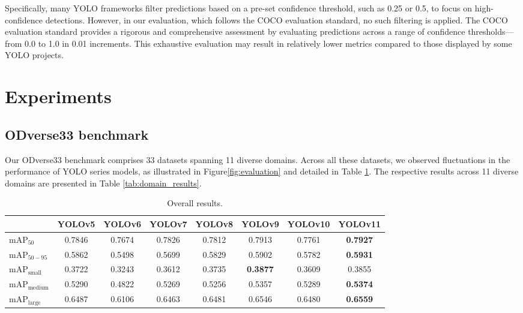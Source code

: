 \documentclass[runningheads]{llncs}
\begin{document}
Specifically, many YOLO frameworks filter predictions based on a pre-set confidence threshold, such as 0.25 or 0.5, to focus on high-confidence detections. However, in our evaluation, which follows the COCO evaluation standard, no such filtering is applied. The COCO evaluation standard provides a rigorous and comprehensive assessment by evaluating predictions across a range of confidence thresholds—from 0.0 to 1.0 in 0.01 increments.  This exhaustive evaluation may result in relatively lower metrics compared to those displayed by some YOLO projects. 





\section{Experiments}
\subsection{ODverse33 benchmark}
\label{sec:blind} 
Our ODverse33 benchmark comprises 33 datasets spanning 11 diverse domains. Across all these datasets, we observed fluctuations in the performance of YOLO series models, as illustrated in Figure\ref{fig:evaluation} and detailed in Table \ref{tab:results}. 
The respective results across 11 diverse domains are presented in Table \ref{tab:domain_results}.

\begin{table}
\centering
\begin{tabular}{lccccccc}
\hline
            & YOLOv5 & YOLOv6 & YOLOv7 & YOLOv8 & YOLOv9 & YOLOv10 & YOLOv11 \\
\hline
mAP$_{50}$          & 0.7846 & 0.7674 & 0.7826 & 0.7812 & 0.7913 & 0.7761 & \textbf{0.7927}\\
mAP$_{50-95}$       & 0.5862 & 0.5498 & 0.5699 & 0.5829 & 0.5902 & 0.5782 & \textbf{0.5931}\\
mAP$_{\text{small}}$  & 0.3722 & 0.3243 & 0.3612 & 0.3735 & \textbf{0.3877}& 0.3609 & 0.3855 
\\
mAP$_{\text{medium}}$ & 0.5290 & 0.4822 & 0.5269 & 0.5256 & 0.5357 & 0.5289 & \textbf{0.5374}\\
mAP$_{\text{large}}$  & 0.6487 & 0.6106 & 0.6463 & 0.6481 & 0.6546 & 0.6480 & \textbf{0.6559}\\
\hline
\end{tabular}
\caption{Overall results.}
\label{tab:results}
\end{table}
\end{document}
